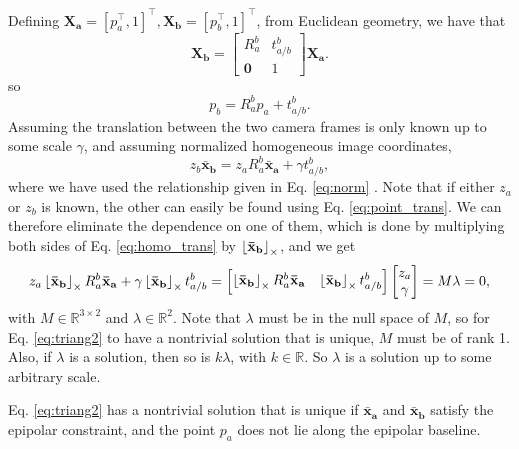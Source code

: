 
	
	
	Defining $\mathbf{X_a} = [p_a^\top, 1]^\top, \mathbf{X_b} = [p_b^\top, 1]^\top$, from Euclidean geometry, we have that
	\begin{equation}
	\mathbf{X_b} = \left[\begin{matrix} R_a^b & t_{a/b}^b \\ \mathbf{0} & 1 \end{matrix}\right] \mathbf{X_a}.
	\end{equation}
	so
	\begin{equation}
	p_b = R_a^b p_a + t_{a/b}^b.
	\label{eq:point_trans}
	\end{equation}
	Assuming the translation between the two camera frames is only known up to some scale $\gamma$, and assuming normalized homogeneous image coordinates,
	\begin{equation}
	z_b \mathbf{\bar{x}_b} = z_a R_a^b \mathbf{\bar{x}_a} + \gamma t_{a/b}^b,
	\label{eq:homo_trans}
	\end{equation}
	where we have used the relationship given in Eq. \ref{eq:norm} \cite{Ma2003}. Note that if either $z_a$ or $z_b$ is known, the other can easily be found using Eq. \ref{eq:point_trans}. We can therefore eliminate the dependence on one of them, which is done by multiplying both sides of Eq. \ref{eq:homo_trans} by $\ss{\mathbf{\bar{x}_b}}$, and we get
	\begin{equation}
	z_a \ss{\mathbf{\bar{x}_b}} R_a^b \mathbf{\bar{x}_a} + \gamma \ss{\mathbf{\bar{x}_b}} t_{a/b}^b = \left[\begin{matrix}\ss{\mathbf{\bar{x}_b}} R_a^b \mathbf{\bar{x}_a} & \ss{\mathbf{\bar{x}_b}} t_{a/b}^b \end{matrix}\right] \left[\begin{matrix} z_a \\ \gamma \end{matrix}\right] = M\lambda = 0,
	\label{eq:triang2}
	\end{equation}
	with $M \in \mathbb{R}^{3\times 2}$ and $\lambda \in \mathbb{R}^2$. Note that $\lambda$ must be in the null space of $M$, so for Eq. \ref{eq:triang2} to have a nontrivial solution that is unique, $M$ must be of rank 1. Also, if $\lambda$ is a solution, then so is $k\lambda$, with $k \in \mathbb{R}$. So $\lambda$ is a solution up to some arbitrary scale.
	
	\begin{theorem}
		Eq. \ref{eq:triang2} has a nontrivial solution that is unique if $\mathbf{\bar{x}_a}$ and $\mathbf{\bar{x}_b}$ satisfy the epipolar constraint, and the point $p_a$ does not lie along the epipolar baseline.
	\end{theorem}
	
